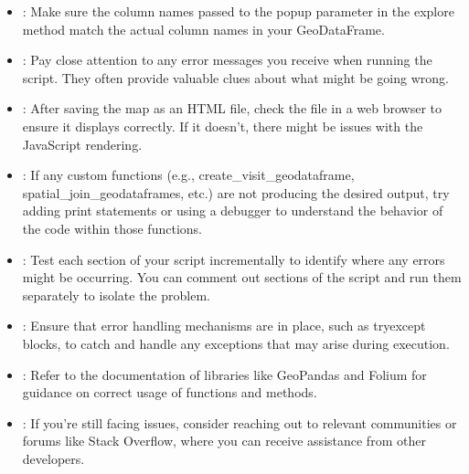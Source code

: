\documentclass[letterpaper,10pt,english]{sphinxmanual}
\begin{document}
\begin{itemize}
\item {} 
\sphinxAtStartPar
{}: Make sure the column names passed to the popup parameter in the explore method match the actual column names in your GeoDataFrame.

\item {} 
\sphinxAtStartPar
{}: Pay close attention to any error messages you receive when running the script. They often provide valuable clues about what might be going wrong.

\item {} 
\sphinxAtStartPar
{}: After saving the map as an HTML file, check the file in a web browser to ensure it displays correctly. If it doesn’t, there might be issues with the JavaScript rendering.

\item {} 
\sphinxAtStartPar
{}: If any custom functions (e.g., create\_visit\_geodataframe, spatial\_join\_geodataframes, etc.) are not producing the desired output, try adding print statements or using a debugger to understand the behavior of the code within those functions.

\item {} 
\sphinxAtStartPar
{}: Test each section of your script incrementally to identify where any errors might be occurring. You can comment out sections of the script and run them separately to isolate the problem.

\item {} 
\sphinxAtStartPar
{}: Ensure that error handling mechanisms are in place, such as try\sphinxhyphen{}except blocks, to catch and handle any exceptions that may arise during execution.

\item {} 
\sphinxAtStartPar
{}: Refer to the documentation of libraries like GeoPandas and Folium for guidance on correct usage of functions and methods.

\item {} 
\sphinxAtStartPar
{}: If you’re still facing issues, consider reaching out to relevant communities or forums like Stack Overflow, where you can receive assistance from other developers.

\end{itemize}
\end{document}

